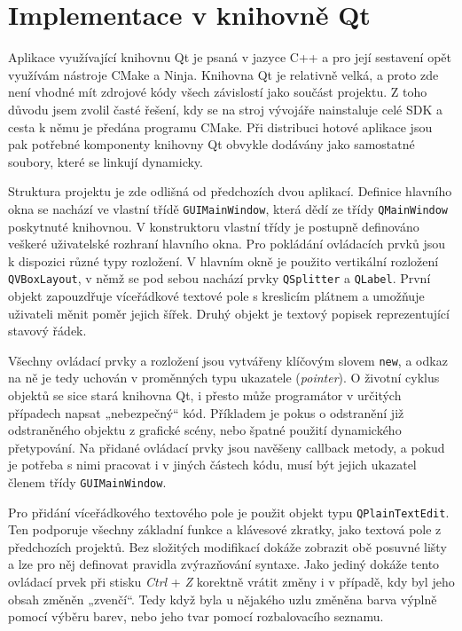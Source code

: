 \documentclass[FM,DP]{tulthesis}
\begin{document}
	\section{Implementace v knihovně Qt}
	
	Aplikace využívající knihovnu Qt je psaná v jazyce C++ a pro její sestavení opět využívám nástroje CMake a Ninja. Knihovna Qt je relativně velká, a proto zde není vhodné mít zdrojové kódy všech závislostí jako součást projektu. Z toho důvodu jsem zvolil časté řešení, kdy se na stroj vývojáře nainstaluje celé SDK a cesta k němu je předána programu CMake. Při distribuci hotové aplikace jsou pak potřebné komponenty knihovny Qt obvykle dodávány jako samostatné soubory, které se linkují dynamicky.
	
	
	Struktura projektu je zde odlišná od předchozích dvou aplikací.	Definice hlavního okna se nachází ve vlastní třídě \texttt{GUIMainWindow}, která dědí ze třídy \texttt{QMainWindow} poskytnuté knihovnou. V konstruktoru vlastní třídy je postupně definováno veškeré uživatelské rozhraní hlavního okna. Pro pokládání ovládacích prvků jsou k dispozici různé typy rozložení. V hlavním okně je použito vertikální rozložení \texttt{QVBoxLayout}, v němž se pod sebou nachází prvky \texttt{QSplitter} a \texttt{QLabel}. První objekt zapouzdřuje víceřádkové textové pole s kreslicím plátnem a umožňuje uživateli měnit poměr jejich šířek. Druhý objekt je textový popisek reprezentující stavový řádek.
	
	Všechny ovládací prvky a rozložení jsou vytvářeny klíčovým slovem \texttt{new}, a odkaz na ně je tedy uchován v proměnných typu ukazatele (\textit{pointer}). O životní cyklus objektů se sice stará knihovna Qt, i přesto může programátor v určitých případech napsat „nebezpečný“ kód. Příkladem je pokus o odstranění již odstraněného objektu z grafické scény, nebo špatné použití dynamického přetypování. Na přidané ovládací prvky jsou navěšeny callback metody, a pokud je potřeba s nimi pracovat i v jiných částech kódu, musí být jejich ukazatel členem třídy \texttt{GUIMainWindow}.
	
	Pro přidání víceřádkového textového pole je použit objekt typu \texttt{QPlainTextEdit}. Ten podporuje všechny základní funkce a klávesové zkratky, jako textová pole z předchozích projektů. Bez složitých modifikací dokáže zobrazit obě posuvné lišty a lze pro něj definovat pravidla zvýrazňování syntaxe. Jako jediný dokáže tento ovládací prvek při stisku \textit{Ctrl} + \textit{Z} korektně vrátit změny i v případě, kdy byl \mbox{jeho} obsah změněn „zvenčí“. Tedy když byla u nějakého uzlu změněna barva výplně pomocí výběru barev, nebo jeho tvar pomocí rozbalovacího seznamu.
	
\end{document}
